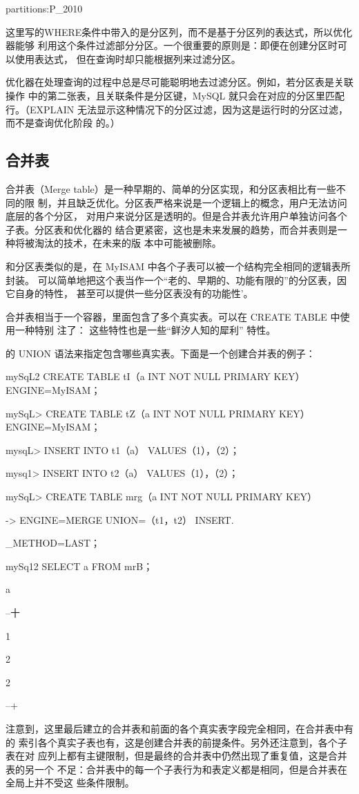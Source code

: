 partitions:P\_2010

这里写的WHERE条件中带入的是分区列，而不是基于分区列的表达式，所以优化器能够
利用这个条件过滤部分分区。一个很重要的原则是：即便在创建分区时可以使用表达式，
但在查询时却只能根据列来过滤分区。

优化器在处理查询的过程中总是尽可能聪明地去过滤分区。例如，若分区表是关联操作
中的第二张表，且关联条件是分区键，MySQL 就只会在对应的分区里匹配行。（EXPLAIN
无法显示这种情况下的分区过滤，因为这是运行时的分区过滤，而不是查询优化阶段
的。）

\subsection{合并表}
合并表（Merge table）是一种早期的、简单的分区实现，和分区表相比有一些不同的限
制，并且缺乏优化。分区表严格来说是一个逻辑上的概念，用户无法访问底层的各个分区，
对用户来说分区是透明的。但是合并表允许用户单独访问各个子表。分区表和优化器的
结合更紧密，这也是未来发展的趋势，而合并表则是一种将被淘汰的技术，在未来的版
本中可能被删除。

和分区表类似的是，在 MyISAM 中各个子表可以被一个结构完全相同的逻辑表所封装。
可以简单地把这个表当作一个“老的、早期的、功能有限的”的分区表，因它自身的特性，
甚至可以提供一些分区表没有的功能性’。

合并表相当于一个容器，里面包含了多个真实表。可以在 CREATE TABLE 中使用一种特别
注了： 这些特性也是一些“鲜汐人知的犀利” 特性。

的 UNION 语法来指定包含哪些真实表。下面是一个创建合并表的例子：

mySqL2 CREATE TABLE tI（a INT NOT NULL PRIMARY KEY） ENGINE=MyISAM；

mySqL> CREATE TABLE tZ（a INT NOT NULL PRIMARY KEY） ENGINE=MyISAM；

mysqL> INSERT INTO t1（a） VALUES（1），（2）；

mysq1> INSERT INTO t2（a） VALUES（1），（2）；

mySqL> CREATE TABLE mrg（a INT NOT NULL PRIMARY KEY）

-> ENGINE=MERGE UNION=（t1，t2） INSERT.

\_METHOD=LAST；

mySq12 SELECT a FROM mrB；

a

--十

1

2

2

--+

注意到，这里最后建立的合并表和前面的各个真实表字段完全相同，在合并表中有的
索引各个真实子表也有，这是创建合并表的前提条件。另外还注意到，各个子表在对
应列上都有主键限制，但是最终的合并表中仍然出现了重复值，这是合并表的另一个
不足：合并表中的每一个子表行为和表定义都是相同，但是合并表在全局上并不受这
些条件限制。

